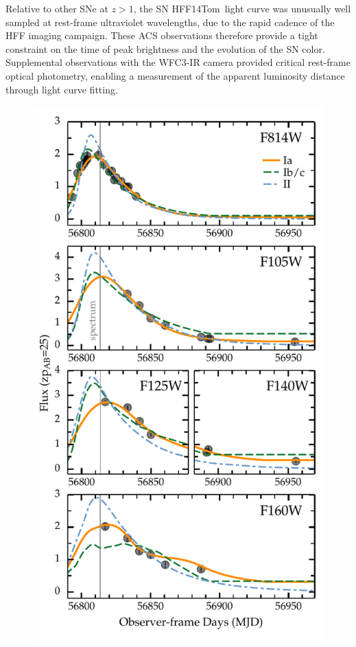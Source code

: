 \documentclass[iop]{emulateapj}
\def\tomas{HFF14Tom}
\begin{document}
Relative to other SNe at $z>1$, the SN \tomas\ light curve was
unusually well sampled at rest-frame ultraviolet wavelengths, due to
the rapid cadence of the HFF imaging campaign. These ACS observations
therefore provide a tight constraint on the time of peak brightness
and the evolution of the SN color.  Supplemental observations with the
WFC3-IR camera provided critical rest-frame optical photometry,
enabling a measurement of the apparent luminosity distance through
light curve fitting.

\begin{figure}
\begin{center}
\includegraphics[width=\columnwidth]{snTomas_lightcurve_classification}

\end{center}
\end{figure}
\end{document}
